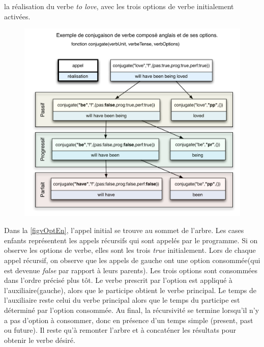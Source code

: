 \documentclass[11pt]{article} %
\begin{document}
 la réalisation du verbe \emph{to love}, avec les trois options
de verbe initialement activées.
\begin{figure}
\centering
\caption{}
\includegraphics[scale=0.7]{love-conjOptions}
\label{figvOptEn}
\end{figure}

{\small{} Dans la \autoref{figvOptEn}, l'appel initial se trouve au sommet de l'arbre. Les 
cases enfants représentent les appels récursifs qui sont appelés par le programme.
Si on observe les options de verbe, elles sont les trois \emph{true} initialement. Lors de
chaque appel récursif, on observe que les appels de gauche ont une option consommée(qui est devenue
\emph{false} par rapport à leurs parents). Les trois options sont consommées dans l'ordre précisé plus tôt. 
Le verbe prescrit par l'option est appliqué à l'auxiliaire(gauche), alors que le participe obtient le verbe 
principal. Le temps de l'auxiliaire reste celui du verbe principal alors que le temps du participe est déterminé
 par l'option consommée. Au final, la récursivité se termine lorsqu'il n'y a pas d'option à consommer, donc en
présence d'un temps simple (present, past ou future). Il reste qu'à remonter l'arbre et à concaténer les résultats
pour obtenir le verbe désiré.}
\end{document}
